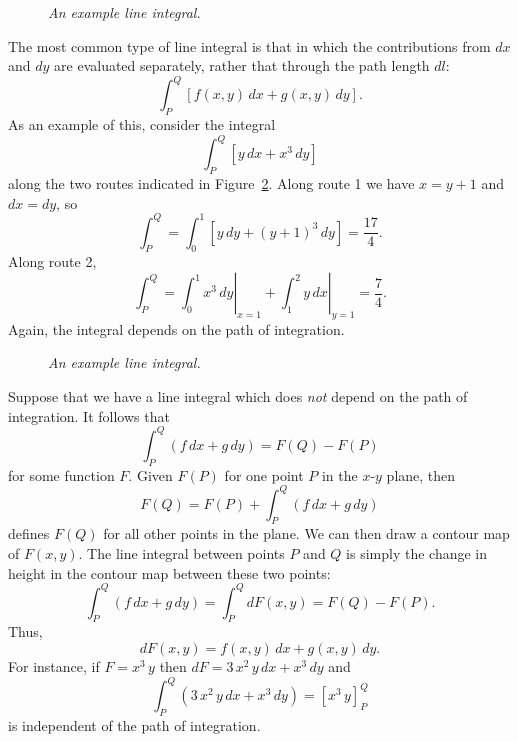 \begin{figure}
\epsfysize=1.5in
\centerline{}
\caption{\em An example line integral.}\label{f11}
\end{figure}

The most common type of line integral is that in which the contributions from $dx$ and $dy$ are evaluated
separately, rather that through the path length $dl$:
\begin{equation}
\int_P^Q \left[ f(x,y)\,dx + g(x,y)\,dy\right].
\end{equation}
As an example of this, consider the integral
\begin{equation}
\int_P^Q \left[ y\,dx + x^3\,dy\right]
\end{equation}
along the two routes indicated in Figure~\ref{f12}.
Along route 1 we have $x=y+1$ and $dx=dy$, so
\begin{equation}
\int_P^Q = \int_{0}^1\left[y\,dy + (y+1)^3\,dy\right] = \frac{17}{4}.
\end{equation}
Along route 2,
\begin{equation}
\int_P^Q = \left.\int_0^1 x^3\,dy\right|_{x=1} + \left.\int_1^2 y\,dx\right|_{y=1} = \frac{7}{4}.
\end{equation}
Again, the integral depends on the path of integration. 
\begin{figure}[b]
\epsfysize=1.5in
\centerline{}
\caption{\em An example line integral.}\label{f12}
\end{figure}

Suppose that we have a line integral which does {\em not} depend on the path of integration. It
follows that
\begin{equation}
\int_P^Q \left(f\,dx + g\,dy\right) = F(Q) - F(P)
\end{equation}
for some function $F$. Given $F(P)$ for one point $P$ in the $x$-$y$ plane, then
\begin{equation}
F(Q) = F(P) + \int_P^Q \left(f\,dx + g\,dy\right)
\end{equation}
defines $F(Q)$ for all other points in the plane. We can then draw a contour map of $F(x,y)$.
The line integral between points $P$ and $Q$ is simply the change in height in the contour
map between these two points:
\begin{equation}
\int_P^Q \left(f\,dx + g\,dy\right) = \int_P^Q dF(x,y) = F(Q) - F(P).
\end{equation}
Thus,
\begin{equation}
dF(x,y) = f(x,y)\,dx + g(x,y)\,dy.
\end{equation}
For instance, if $F=x^3\,y$ then $dF= 3\,x^2\,y\,dx + x^3\,dy$ and 
\begin{equation}
\int_P^Q \left(3\,x^2\,y\,dx + x^3\,dy\right) = \left[x^3\,y\right]_P^Q 
\end{equation}
is independent of the path of integration. 

